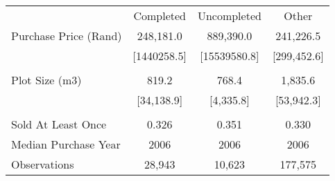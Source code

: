 \begin{tabu}{lccc}
\toprule
 & Completed & Uncompleted & Other  \\
 Purchase Price (Rand)  & 248,181.0  & 889,390.0  & 241,226.5  \\ 
\rowfont{\footnotesize} & [1440258.5]  & [15539580.8]  & [299,452.6]  \\ 
 &  &  &  \\ 
 Plot Size (m3)  & 819.2  & 768.4  & 1,835.6  \\ 
\rowfont{\footnotesize} & [34,138.9]  & [4,335.8]  & [53,942.3]  \\ 
 &  &  &  \\ 
 Sold At Least Once  & 0.326  & 0.351  & 0.330  \\ 
 Median Purchase Year  & 2006  & 2006  & 2006  \\ 
\midrule
 Observations  & 28,943  & 10,623  & 177,575  \\ 
\bottomrule
\end{tabu}
